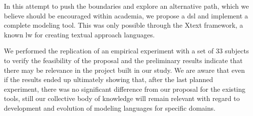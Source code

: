 In this attempt to push the boundaries and explore an alternative path, which we believe should be encouraged within academia, we propose a \ac{dsl} and implement a complete modeling tool.
This was only possible through the Xtext framework, a known \ac{lw} for creating textual approach languages.

We performed the replication of an empirical experiment with a set of 33 subjects to verify the feasibility of the proposal and the preliminary results indicate that there may be relevance in the project built in our study.
We are aware that even if the results ended up ultimately showing that, after the last planned experiment, there was no significant difference from our proposal for the existing tools, still our collective body of knowledge will remain relevant with regard to development and evolution of modeling languages for specific domains.

